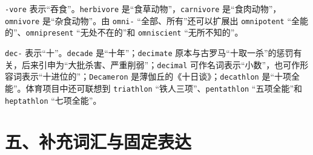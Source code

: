 \documentclass[UTF8,zihao=-4]{ctexart}
\begin{document}
\texttt{-vore} 表示“吞食”。\texttt{herbivore} 是“食草动物”，\texttt{carnivore} 是“食肉动物”，\texttt{omnivore} 是“杂食动物”。由 \texttt{omni-} “全部、所有”还可以扩展出 \texttt{omnipotent} “全能的”、\texttt{omnipresent} “无处不在的”和 \texttt{omniscient} “无所不知的”。

\texttt{dec-} 表示“十”。\texttt{decade} 是“十年”；\texttt{decimate} 原本与古罗马“十取一杀”的惩罚有关，后来引申为“大批杀害、严重削弱”；\texttt{decimal} 可作名词表示“小数”，也可作形容词表示“十进位的”；\texttt{Decameron} 是薄伽丘的《十日谈》；\texttt{decathlon} 是“十项全能”。体育项目中还可联想到 \texttt{triathlon} “铁人三项”、\texttt{pentathlon} “五项全能”和 \texttt{heptathlon} “七项全能”。

\section*{五、补充词汇与固定表达}
\end{document}
